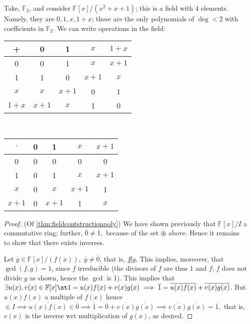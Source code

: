 \documentclass[12pt,oneside]{article}
\begin{document}
\begin{example}
  Take, $\mathbb{F}_2$, and consider $\mathbb{F}[x]/(x^2 + x+ 1)$; this is a field with $4$ elements. Namely, they are $0, 1, x, 1 + x$; these are the only polynomials of $\deg < 2$ with coefficients in $\mathbb{F}_2$. We can write operations in the field:
  \begin{center}
    \begin{tabular}{c|cccc}
      + & 0 & 1 & $x$ & $1+x$\\
      \hline
      0 & 0 & 1 & $x$ & $x+1$\\
      1 & 1 & 0 & $x+1$ & $x$\\
      $x$ & $x$ & $x+1$ & 0 & 1\\
      $1 + x$ & $x +1$ & $x$ & 1 & 0
    \end{tabular}\\
    \begin{tabular}{c|cccc}
      $\cdot$ & 0 & 1 & $x$ & $x+1$\\
      \hline
      0 & 0 & 0 & 0 & 0\\
      1 & 0 & 1 & $x$ & $x+1$ \\
      $x$ & 0 & $x$ & $x+1$ & 1\\
      $x + 1$ & 0 &$ x+1$ & 1 & $x$
    \end{tabular}
  \end{center}
\end{example}

\begin{proof}(Of \cref{thm:fieldcontstructionpoly}) We have shown previously that $\mathbb{F}[x]/I$ a commutative ring; further, $\overline{0} \neq \overline{1},$ because of the set $\circledast$ above. Hence it remains to show that there exists inverses.\footnotemark

  Let $\overline{g} \in \mathbb{F}[x]/(f(x)),$ $\overline{g} \neq \overline{0}$, that is, $f \not|g$. This implies, moreover, that $\gcd (f,g) = 1$, since $f$ irreducible (the divisors of $f$ are thus $1$ and $f$; $f$ does not divide $g$ as shown, hence the $\gcd$ is 1). This implies that $\exists u(x), v(x) \in \mathbb{F}[x] \st 1 = u(x)f(x) + v(x)g(x) \implies \overline{1} = \overline{u(x) f(x)} + \overline{v(x)g(x)}$. But $u(x) f(x)$ a multiple of $f(x)$ hence $\in I \implies \overline{u(x)f(x)} \in \overline{0} \implies \overline{1} = \overline{0} + \overline{v(x)}\overline{g(x)} \implies \overline{v(x)}\overline{g(x)} = \overline{1},$ that is, $v(x)$ is the inverse wrt multiplication of $g(x)$, as desired.
  
\end{proof}
\end{document}
